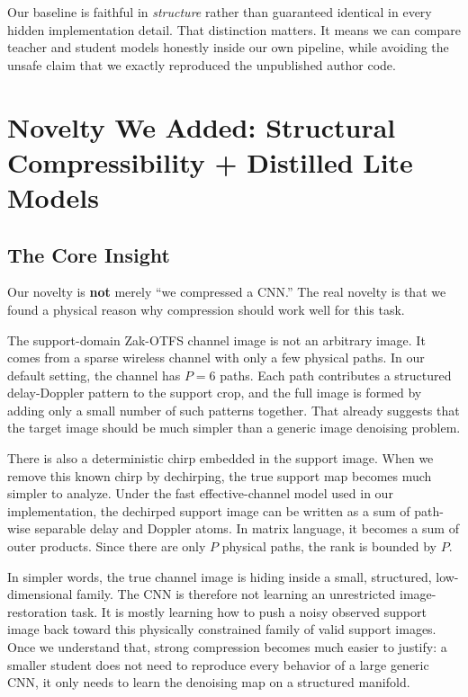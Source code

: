 \documentclass[10pt]{article}
\begin{document}
Our baseline is faithful in \emph{structure} rather than guaranteed identical in every hidden implementation detail. That distinction matters. It means we can compare teacher and student models honestly inside our own pipeline, while avoiding the unsafe claim that we exactly reproduced the unpublished author code.

\section{Novelty We Added: Structural Compressibility + Distilled Lite Models}

\subsection{The Core Insight}

Our novelty is \textbf{not} merely ``we compressed a CNN.'' The real novelty is that we found a physical reason why compression should work well for this task.

The support-domain Zak-OTFS channel image is not an arbitrary image. It comes from a sparse wireless channel with only a few physical paths. In our default setting, the channel has $P=6$ paths. Each path contributes a structured delay-Doppler pattern to the support crop, and the full image is formed by adding only a small number of such patterns together. That already suggests that the target image should be much simpler than a generic image denoising problem.

There is also a deterministic chirp embedded in the support image. When we remove this known chirp by dechirping, the true support map becomes much simpler to analyze. Under the fast effective-channel model used in our implementation, the dechirped support image can be written as a sum of path-wise separable delay and Doppler atoms. In matrix language, it becomes a sum of outer products. Since there are only $P$ physical paths, the rank is bounded by $P$.

In simpler words, the true channel image is hiding inside a small, structured, low-dimensional family. The CNN is therefore not learning an unrestricted image-restoration task. It is mostly learning how to push a noisy observed support image back toward this physically constrained family of valid support images. Once we understand that, strong compression becomes much easier to justify: a smaller student does not need to reproduce every behavior of a large generic CNN, it only needs to learn the denoising map on a structured manifold.
\end{document}
